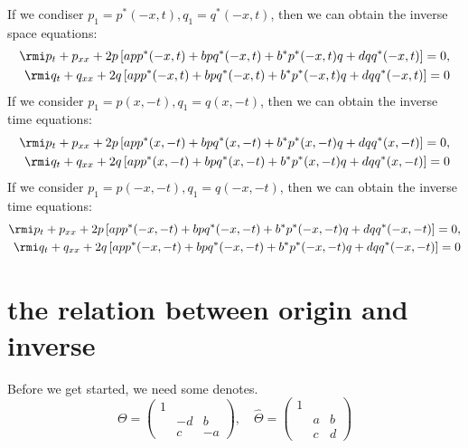 If we condiser $p_{1} = p^{*}(-x,t), q_{1} = q^{*}(-x,t) $, then we can obtain the inverse space equations:
\begin{align}
    \rmi p_{t} + p_{xx} + 2p \left[ app^{*}(-x,t) + bpq^{*}(-x,t) + b^{*}p^{*}(-x,t)q + dqq^{*}(-x,t) \right] = 0, \label{eq:AKNS-inverse-x}\\
    \rmi q_{t} + q_{xx} + 2q \left[ app^{*}(-x,t) + bpq^{*}(-x,t) + b^{*}p^{*}(-x,t)q + dqq^{*}(-x,t) \right] = 0
\end{align}
If we consider $ p_{1} = p(x,-t), q_{1} = q(x,-t) $, then we can obtain the inverse time equations:
\begin{align}
    \rmi p_{t} + p_{xx} + 2p \left[ app^{*}(x,-t) + bpq^{*}(x,-t) + b^{*}p^{*}(x,-t)q + dqq^{*}(x,-t) \right] = 0, \label{eq:AKNS-inverse-t}\\
    \rmi q_{t} + q_{xx} + 2q \left[ app^{*}(x,-t) + bpq^{*}(x,-t) + b^{*}p^{*}(x,-t)q + dqq^{*}(x,-t) \right] = 0
\end{align}
If we consider $ p_{1} = p(-x,-t), q_{1} = q(-x,-t) $, then we can obtain the inverse time equations:
\begin{align}
    \rmi p_{t} + p_{xx} + 2p \left[ app^{*}(-x,-t) + bpq^{*}(-x,-t) + b^{*}p^{*}(-x,-t)q + dqq^{*}(-x,-t) \right] = 0, \label{eq:AKNS-inverse-x-t}\\
    \rmi q_{t} + q_{xx} + 2q \left[ app^{*}(-x,-t) + bpq^{*}(-x,-t) + b^{*}p^{*}(-x,-t)q + dqq^{*}(-x,-t) \right] = 0
\end{align}
\section{the relation between origin and inverse}
Before we get started, we need some denotes. 
\begin{equation}
    \Theta = \begin{pmatrix}
        1 & & \\ & -d & b \\ & c & -a
    \end{pmatrix}, \quad \hat{\Theta} = \begin{pmatrix}
        1 & & \\ & a & b \\ & c & d
    \end{pmatrix}
\end{equation} 

